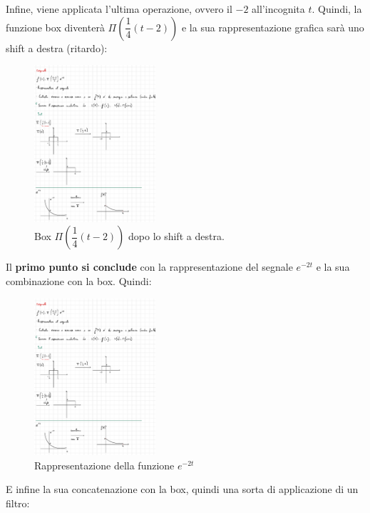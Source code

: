 \documentclass[a4paper]{article}
\begin{document}
	Infine, viene applicata l'ultima operazione, ovvero il $-2$ all'incognita $t$. Quindi, la funzione box diventerà $\Pi\left(\dfrac{1}{4}\left(t-2\right)\right)$ e la sua rappresentazione grafica sarà uno shift a destra (ritardo):
	
	\begin{figure}[!htp]
		\centering
		\includegraphics[width=0.4\textwidth]{img/ex_exam/Pi_func_1-Mod2.pdf}
		\caption{Box $\Pi\left(\dfrac{1}{4}\left(t-2\right)\right)$ dopo lo shift a destra.}
	\end{figure}

	\newpage

	Il \textbf{primo punto si conclude} con la rappresentazione del segnale $e^{-2t}$ e la sua combinazione con la box. Quindi:
	
	\begin{figure}[!htp]
		\centering
		\includegraphics[width=0.4\textwidth]{img/ex_exam/E_func_1.pdf}
		\caption{Rappresentazione della funzione $e^{-2t}$}
	\end{figure}

	\noindent
	E infine la sua concatenazione con la box, quindi una sorta di applicazione di un filtro:
	
\end{document}
